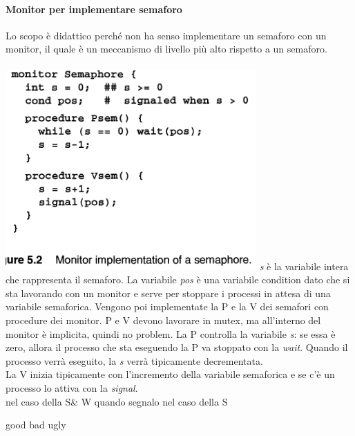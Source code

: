 \documentclass[10pt,a4paper]{book}
\begin{document}
\paragraph{Monitor per implementare semaforo}
Lo scopo è didattico perché non ha senso implementare un semaforo con un monitor, il quale è un meccanismo di livello più alto rispetto a un semaforo.\\ \\
\includegraphics[scale=0.51]{img/monsem.png} 
\textit{s} è la variabile intera che rappresenta il semaforo. La variabile \textit{pos} è una variabile condition dato che si sta lavorando con un monitor e serve per stoppare i processi in attesa di una variabile semaforica.
Vengono poi implementate la P e la V dei semafori con procedure dei monitor.
P e V devono lavorare in mutex, ma all'interno del monitor è implicita, quindi no problem.
La P controlla la variabile \textit{s}: se essa è zero, allora il processo che sta eseguendo la P va stoppato con la \textit{wait}. Quando il processo verrà eseguito, la \textit{s} verrà tipicamente decrementata.\\
La V inizia tipicamente con l'incremento della variabile semaforica e se c'è un processo lo attiva con la \textit{signal}.\\
nel caso della S\& W quando segnalo 
nel caso della S


good bad ugly
\end{document}
